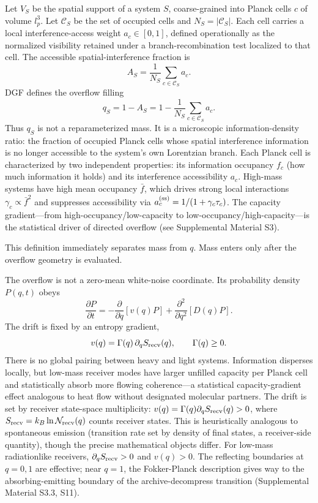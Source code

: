 \documentclass[aps,prl,twocolumn,superscriptaddress,nofootinbib,floatfix]{revtex4-2}
\begin{document}
Let $V_S$ be the spatial support of a system $S$, coarse-grained into Planck cells $c$ of volume $l_p^3$. Let $\mathcal C_S$ be the set of occupied cells and $N_S=|\mathcal C_S|$. Each cell carries a local interference-access weight $a_c\in[0,1]$, defined operationally as the normalized visibility retained under a branch-recombination test localized to that cell. The accessible spatial-interference fraction is
\begin{equation}
A_S=\frac{1}{N_S}\sum_{c\in\mathcal C_S}a_c .
\end{equation}
DGF defines the overflow filling
\begin{equation}
\boxed{q_S=1-A_S
=1-\frac{1}{N_S}\sum_{c\in\mathcal C_S}a_c.}
\end{equation}
Thus $q_S$ is not a reparameterized mass. It is a microscopic information-density ratio: the fraction of occupied Planck cells whose spatial interference information is no longer accessible to the system's own Lorentzian branch. Each Planck cell is characterized by two independent properties: its information occupancy $f_c$ (how much information it holds) and its interference accessibility $a_c$. High-mass systems have high mean occupancy $\bar{f}$, which drives strong local interactions $\gamma_c\propto\bar{f}^2$ and suppresses accessibility via $a_c^{\rm(ss)}=1/(1+\gamma_c\tau_c)$. The capacity gradient---from high-occupancy/low-capacity to low-occupancy/high-capacity---is the statistical driver of directed overflow (see Supplemental Material S3).

This definition immediately separates mass from $q$. Mass enters only after the overflow geometry is evaluated.

The overflow is not a zero-mean white-noise coordinate. Its probability density $P(q,t)$ obeys
\begin{equation}
\boxed{
\frac{\partial P}{\partial t}
=-\frac{\partial}{\partial q}\!\left[v(q)P\right]
+\frac{\partial^2}{\partial q^2}\!\left[D(q)P\right].
}
\end{equation}
The drift is fixed by an entropy gradient,
\begin{equation}
v(q)=\Gamma(q)\,\partial_q S_{\rm recv}(q),
\qquad
\Gamma(q)\ge0 .
\end{equation}
There is no global pairing between heavy and light systems. Information disperses locally, but low-mass receiver modes have larger unfilled capacity per Planck cell and statistically absorb more flowing coherence---a statistical capacity-gradient effect analogous to heat flow without designated molecular partners. The drift is set by receiver state-space multiplicity: $v(q)=\Gamma(q)\partial_qS_{\rm recv}(q)>0$, where $S_{\rm recv}=k_B\ln\mathcal{N}_{\rm recv}(q)$ counts receiver states. This is heuristically analogous to spontaneous emission (transition rate set by density of final states, a receiver-side quantity), though the precise mathematical objects differ. For low-mass radiationlike receivers, $\partial_qS_{\rm recv}>0$ and $v(q)>0$. The reflecting boundaries at $q=0,1$ are effective; near $q=1$, the Fokker-Planck description gives way to the absorbing-emitting boundary of the archive-decompress transition (Supplemental Material S3.3, S11).
\end{document}
